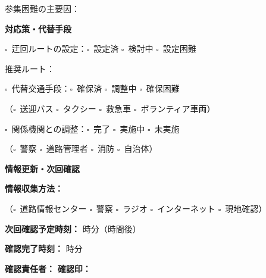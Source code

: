 \documentclass[a4paper,12pt]{jarticle}
\newcommand{\checkbox}{$\square$\ }
\newcommand{\underlinespace}[1]{\underline{\hspace{#1}}}
\begin{document}
\vspace{2mm}

\noindent
参集困難の主要因：\underlinespace{10cm}

\vspace{8mm}

\begin{center}
\textbf{\large 対応策・代替手段}
\end{center}

\vspace{3mm}

\noindent
\checkbox 迂回ルートの設定：\checkbox 設定済 \quad \checkbox 検討中 \quad \checkbox 設定困難

\vspace{2mm}

\noindent
推奨ルート：\underlinespace{10cm}

\vspace{3mm}

\noindent
\checkbox 代替交通手段：\checkbox 確保済 \quad \checkbox 調整中 \quad \checkbox 確保困難

\vspace{2mm}

\noindent
（\checkbox 送迎バス \quad \checkbox タクシー \quad \checkbox 救急車 \quad \checkbox ボランティア車両）

\vspace{3mm}

\noindent
\checkbox 関係機関との調整：\checkbox 完了 \quad \checkbox 実施中 \quad \checkbox 未実施

\vspace{2mm}

\noindent
（\checkbox 警察 \quad \checkbox 道路管理者 \quad \checkbox 消防 \quad \checkbox 自治体）

\vspace{8mm}

\begin{center}
\textbf{\large 情報更新・次回確認}
\end{center}

\vspace{3mm}

\noindent
\textbf{情報収集方法：}

\vspace{2mm}

\noindent
（\checkbox 道路情報センター \quad \checkbox 警察 \quad \checkbox ラジオ \quad \checkbox インターネット \quad \checkbox 現地確認）

\vspace{3mm}

\noindent
\textbf{次回確認予定時刻：} \underlinespace{2cm}時\underlinespace{2cm}分（\underlinespace{2cm}時間後）

\vspace{3mm}

\noindent
\textbf{確認完了時刻：} \underlinespace{1cm}時\underlinespace{1cm}分

\vspace{3mm}

\noindent
\textbf{確認責任者：} \underlinespace{4cm} \quad \textbf{確認印：} \underlinespace{3cm}
\end{document}
